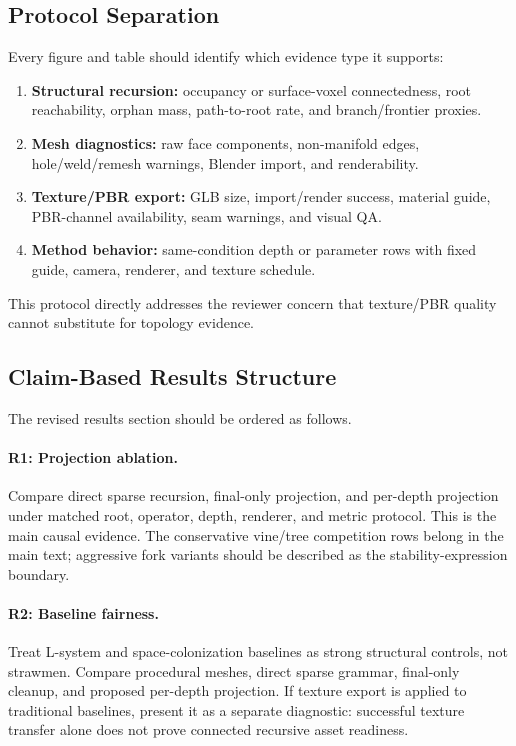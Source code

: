 \subsection{Protocol Separation}

Every figure and table should identify which evidence type it supports:
\begin{enumerate}
  \item \textbf{Structural recursion:} occupancy or surface-voxel connectedness,
  root reachability, orphan mass, path-to-root rate, and branch/frontier proxies.
  \item \textbf{Mesh diagnostics:} raw face components, non-manifold edges,
  hole/weld/remesh warnings, Blender import, and renderability.
  \item \textbf{Texture/PBR export:} GLB size, import/render success, material
  guide, PBR-channel availability, seam warnings, and visual QA.
  \item \textbf{Method behavior:} same-condition depth or parameter rows with
  fixed guide, camera, renderer, and texture schedule.
\end{enumerate}
This protocol directly addresses the reviewer concern that texture/PBR quality
cannot substitute for topology evidence.

\subsection{Claim-Based Results Structure}

The revised results section should be ordered as follows.

\paragraph{R1: Projection ablation.}
Compare direct sparse recursion, final-only projection, and per-depth projection
under matched root, operator, depth, renderer, and metric protocol. This is the
main causal evidence. The conservative vine/tree competition rows belong in the
main text; aggressive fork variants should be described as the
stability-expression boundary.

\paragraph{R2: Baseline fairness.}
Treat L-system and space-colonization baselines as strong structural controls,
not strawmen. Compare procedural meshes, direct sparse grammar, final-only
cleanup, and proposed per-depth projection. If texture export is applied to
traditional baselines, present it as a separate diagnostic: successful texture
transfer alone does not prove connected recursive asset readiness.

